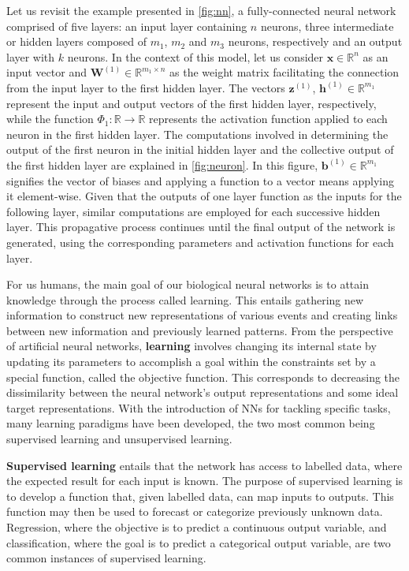 Let us revisit the example presented in \autoref{fig:nn}, a fully-connected neural network comprised of five layers: an input layer containing $n$ neurons, three intermediate or hidden layers composed of $m_1$, $m_2$ and $m_3$ neurons, respectively and an output layer with $k$ neurons. In the context of this model, let us consider $\symbf{x} \in\mathbb{R}^n$ as an input vector and $\symbf{W}^{(1)} \in\mathbb{R}^{m_1 \times n}$ as the weight matrix facilitating the connection from the input layer to the first hidden layer. The vectors $\symbf{z}^{(1)}$, $\symbf{h}^{(1)} \in\mathbb{R}^{m_1}$ represent the input and output vectors of the first hidden layer, respectively, while the function $\Phi_1 \colon \mathbb{R} \to \mathbb{R}$ represents the activation function applied to each neuron in the first hidden layer. The computations involved in determining the output of the first neuron in the initial hidden layer and the collective output of the first hidden layer are explained in \autoref{fig:neuron}. In this figure, $\symbf{b}^{(1)} \in\mathbb{R}^{m_1}$ signifies the vector of biases and applying a function to a vector means applying it element-wise. Given that the outputs of one layer function as the inputs for the following layer, similar computations are employed for each successive hidden layer. This propagative process continues until the final output of the network is generated, using the corresponding parameters and activation functions for each layer.

For us humans, the main goal of our biological neural networks is to attain knowledge through the process called learning. This entails gathering new information to construct new representations of various events and creating links between new information and previously learned patterns. From the perspective of artificial neural networks, \textbf{learning} involves changing its internal state by updating its parameters to accomplish a goal within the constraints set by a special function, called the objective function. This corresponds to decreasing the dissimilarity between the neural network's output representations and some ideal target representations. With the introduction of NNs for tackling specific tasks, many learning paradigms have been developed, the two most common being supervised learning and unsupervised learning.

\textbf{Supervised learning} entails that the network has access to labelled data, where the expected result for each input is known. The purpose of supervised learning is to develop a function that, given labelled data, can map inputs to outputs. This function may then be used to forecast or categorize previously unknown data. Regression, where the objective is to predict a continuous output variable, and classification, where the goal is to predict a categorical output variable, are two common instances of supervised learning.

